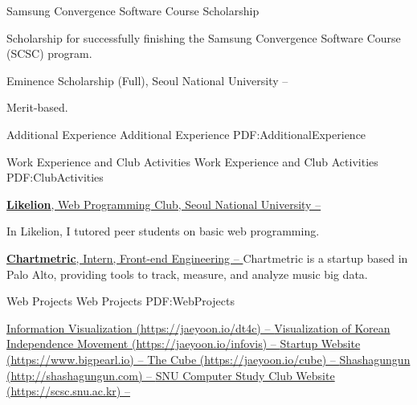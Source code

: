 \documentclass[letterpaper,MMMyyyy,nonstopmode]{template}
\begin{document}
\begin{Body}
\Gap
\BulletItem
Samsung Convergence Software Course Scholarship
\hfill
{}
\begin{Detail}
\Item
Scholarship for successfully finishing the Samsung Convergence Software Course (SCSC) program.
\end{Detail}

\Gap
\BulletItem
Eminence Scholarship (Full),
Seoul National University
\hfill
{} --
\begin{Detail}
\Item
Merit-based.
\end{Detail}


\Section
{Additional Experience}
{Additional Experience}
{PDF:AdditionalExperience}

\SubSection
{Work Experience and Club Activities}
{Work Experience and Club Activities}
{PDF:ClubActivities}

\BigGap
\Entry
  \href{https://likelion.net}
  {\textbf{Likelion}, Web Programming Club, Seoul National University
  \hfill
   --
  }

  \Gap
  \BulletItem
    In Likelion, I tutored peer students on basic web programming.

\BigGap
\Entry
  \href{https://chartmetric.io}
  {\textbf{Chartmetric}, Intern, Front-end Engineering
  \hfill
   --
  }
  \Gap
  \BulletItem
    Chartmetric is a startup based in Palo Alto, providing tools to track, measure, and analyze music big data.

\BigGap
\SubSection
{Web Projects}
{Web Projects}
{PDF:WebProjects}

\BigGap
\BulletItem
\href{https://jaeyoon.io/dt4c}
{Information Visualization (https://jaeyoon.io/dt4c)
\hfill
{} --
}
\Gap
\BulletItem
\href{https://jaeyoon.io/infovis}
{Visualization of Korean Independence Movement (https://jaeyoon.io/infovis)
\hfill
{} --
}
\Gap
\BulletItem
\href{https://www.bigpearl.io/company}
{Startup Website (https://www.bigpearl.io)
\hfill
{} --
}
\Gap
\BulletItem
\href{https://jaeyoon.io}
{The Cube (https://jaeyoon.io/cube)
\hfill
{} --
}
\Gap
\BulletItem
\href{http://shashagungun.com}
{Shashagungun (http://shashagungun.com)
\hfill
{} --
}
\Gap
\BulletItem
\href{http://scsc.snu.ac.kr}
{SNU Computer Study Club Website (https://scsc.snu.ac.kr)
\hfill
{} --
}


\end{Body}
\end{document}
